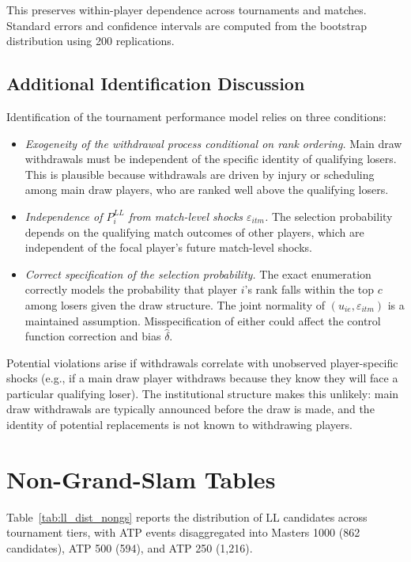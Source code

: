 This preserves within-player dependence across tournaments and matches. Standard errors and confidence intervals are computed from the bootstrap distribution using 200 replications.

\subsection{Additional Identification Discussion}
\label{app:identification}

Identification of the tournament performance model relies on three conditions:

\begin{itemize}
\item \textit{Exogeneity of the withdrawal process conditional on rank ordering.} Main draw withdrawals must be independent of the specific identity of qualifying losers. This is plausible because withdrawals are driven by injury or scheduling among main draw players, who are ranked well above the qualifying losers.
\item \textit{Independence of $P_i^{LL}$ from match-level shocks $\varepsilon_{itm}$.} The selection probability depends on the qualifying match outcomes of other players, which are independent of the focal player's future match-level shocks.
\item \textit{Correct specification of the selection probability.} The exact enumeration correctly models the probability that player $i$'s rank falls within the top $c$ among losers given the draw structure. The joint normality of $(u_{ie}, \varepsilon_{itm})$ is a maintained assumption. Misspecification of either could affect the control function correction and bias $\hat{\delta}$.
\end{itemize}

Potential violations arise if withdrawals correlate with unobserved player-specific shocks (e.g., if a main draw player withdraws because they know they will face a particular qualifying loser). The institutional structure makes this unlikely: main draw withdrawals are typically announced before the draw is made, and the identity of potential replacements is not known to withdrawing players.

\clearpage

\section{Non-Grand-Slam Tables}
\label{app:nongs_tables}

Table~\ref{tab:ll_dist_nongs} reports the distribution of LL candidates across tournament tiers, with ATP events disaggregated into Masters 1000 (862 candidates), ATP 500 (594), and ATP 250 (1,216).

